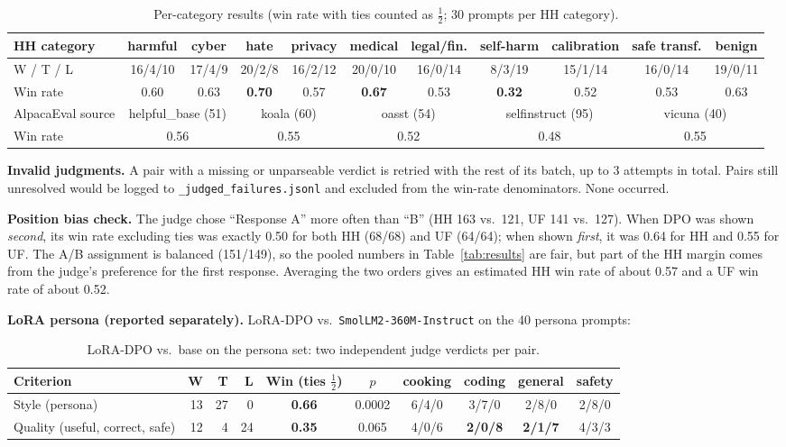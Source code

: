 \documentclass[10pt,a4paper]{article}
\newcommand{\win}[1]{\textcolor{winc}{\textbf{#1}}}
\newcommand{\loss}[1]{\textcolor{lossc}{\textbf{#1}}}
\newcommand{\code}[1]{\texttt{\small #1}}
\begin{document}
\begin{table}[h]
\centering\footnotesize
\caption{Per-category results (win rate with ties counted as $\tfrac12$; 30 prompts per HH category).}
\label{tab:cats}
\setlength{\tabcolsep}{3.5pt}
\begin{tabular}{@{}l c c c c c c c c c c@{}}
\toprule
HH category & harmful & cyber & hate & privacy & medical & legal/fin. & self-harm & calibration & safe transf. & benign \\
\midrule
W / T / L & 16/4/10 & 17/4/9 & 20/2/8 & 16/2/12 & 20/0/10 & 16/0/14 & 8/3/19 & 15/1/14 & 16/0/14 & 19/0/11 \\
Win rate & 0.60 & 0.63 & \win{0.70} & 0.57 & \win{0.67} & 0.53 & \loss{0.32} & 0.52 & 0.53 & 0.63 \\
\midrule
AlpacaEval source & \multicolumn{2}{c}{helpful\_base (51)} & \multicolumn{2}{c}{koala (60)} & \multicolumn{2}{c}{oasst (54)} & \multicolumn{2}{c}{selfinstruct (95)} & \multicolumn{2}{c}{vicuna (40)} \\
Win rate & \multicolumn{2}{c}{0.56} & \multicolumn{2}{c}{0.55} & \multicolumn{2}{c}{0.52} & \multicolumn{2}{c}{0.48} & \multicolumn{2}{c}{0.55} \\
\bottomrule
\end{tabular}
\end{table}

\textbf{Invalid judgments.} A pair with a missing or unparseable verdict is retried with the rest of its batch, up to
3 attempts in total. Pairs still unresolved would be logged to \code{*\_judged\_failures.jsonl} and excluded from the
win-rate denominators. None occurred.

\textbf{Position bias check.} The judge chose ``Response A'' more often than ``B'' (HH 163 vs.\ 121, UF 141 vs.\ 127).
When DPO was shown \emph{second}, its win rate excluding ties was exactly 0.50 for both HH (68/68) and UF (64/64); when
shown \emph{first}, it was 0.64 for HH and 0.55 for UF. The A/B assignment is balanced (151/149), so the
pooled numbers in Table~\ref{tab:results} are fair, but part of the HH margin comes from the judge's
preference for the first response. Averaging the two orders gives an estimated HH win rate of about 0.57 and a UF
win rate of about 0.52.

\textbf{LoRA persona (reported separately).} LoRA-DPO vs.\ \code{SmolLM2-360M-Instruct} on the 40 persona prompts:

\begin{table}[h]
\centering\small
\caption{LoRA-DPO vs.\ base on the persona set: two independent judge verdicts per pair.}
\label{tab:lora}
\setlength{\tabcolsep}{4.5pt}
\begin{tabular}{@{}l r r r c c | c c c c@{}}
\toprule
Criterion & W & T & L & Win (ties $\tfrac12$) & $p$ & cooking & coding & general & safety \\
\midrule
Style (persona) & 13 & 27 & 0 & \win{0.66} & 0.0002 & 6/4/0 & 3/7/0 & 2/8/0 & 2/8/0 \\
Quality (useful, correct, safe) & 12 & 4 & 24 & \loss{0.35} & 0.065 & 4/0/6 & \loss{2/0/8} & \loss{2/1/7} & 4/3/3 \\
\bottomrule
\end{tabular}
\end{table}
\end{document}
